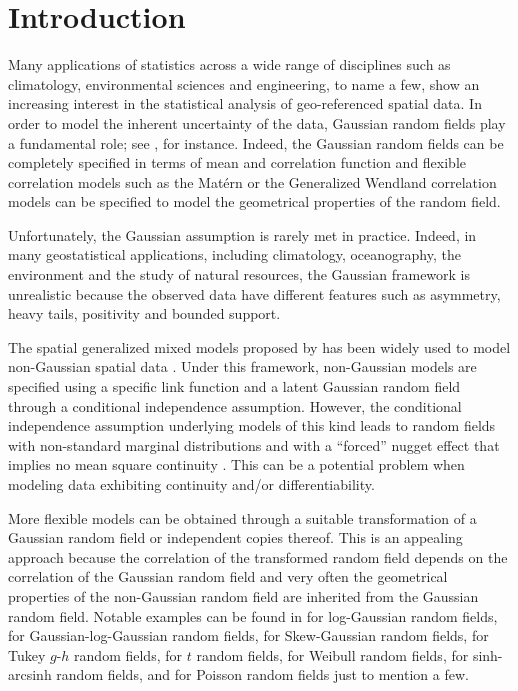 \documentclass[times,sort&compress,3p]{elsarticle}
\theoremstyle{plain}%
\theoremstyle{definition}
\begin{document}
\section{Introduction\label{sec:1}}

Many applications of statistics across a wide range of disciplines such as climatology, environmental sciences and engineering, to name a few, show an increasing interest in the statistical analysis of geo-referenced spatial data. In order to model the inherent uncertainty of the data, Gaussian random fields play a fundamental role; see \cite{Stein:1999,Banerjee-Carlin-Gelfand:2004,Cressie:Wikle:2011}, for instance. Indeed, the Gaussian  random fields can be completely specified in  terms of mean and correlation function and flexible correlation models such as the Matérn \citep{Stein:1999} or the  Generalized Wendland correlation models \citep{bb2019} can be specified to model the geometrical properties of the random field.

Unfortunately, the Gaussian assumption is rarely met in practice. Indeed, in many geostatistical applications, including climatology, oceanography, the environment and the study of natural resources, the Gaussian framework is unrealistic because the observed data have different  features such as asymmetry, heavy tails, positivity and bounded support.

The spatial generalized mixed models  proposed by \citet{Diggle:Tawn:Moyeed:1998} has been widely used to model non-Gaussian spatial data \citep{MoralesNavarrete2021}. Under this framework, non-Gaussian models  are specified using a specific  link function and  a latent Gaussian random field through a conditional independence assumption. However,  the  conditional independence assumption underlying models of this kind leads to random fields with  non-standard marginal distributions and  with a ``forced'' nugget effect that implies no mean square continuity \citep{GELFAND201686,MoralesNavarrete2021}.  This can be a potential problem when modeling data exhibiting continuity and/or differentiability.

More flexible models can be obtained through a suitable transformation of a Gaussian random field or independent copies thereof. This is an appealing approach because the correlation of the transformed random field depends on the correlation of the Gaussian random field and very often the geometrical properties of the non-Gaussian random field are inherited from the Gaussian random field. Notable examples  can be found in  \cite{DeOliveira:2006} for log-Gaussian   random fields, \cite{Palacios:Steel:2006} for Gaussian-log-Gaussian random fields, \cite{Zhang:El-Shaarawi:2010} for Skew-Gaussian random fields, \cite{Xua:Genton:2017} for Tukey $g$-$h$  random fields, \cite{bevilacqua2021non} for $t$ random fields, \cite{bevilacqua2020modeling} for Weibull random fields, \cite{Blasi2022} for sinh-arcsinh random fields, and \citep{MoralesNavarrete2021} for Poisson random fields just to mention a few.
\end{document}
